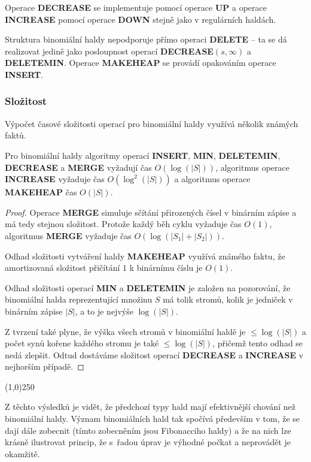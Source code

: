 \documentclass[a4paper,12pt]{article}
\newenvironment{myproof}{
  \begin{proof}
    
  }{
  \end{proof}
  \begin{center}
   \line(1,0){250}
   \end{center}
  }
\begin{document}
Operace {\bf DECREASE} se implementuje pomocí 
ope\-race {\bf UP} a ope\-race {\bf INCREASE} pomocí 
operace {\bf DOWN} stejně jako v regulárních haldách. 


Struktura binomiální haldy nepodporuje přímo operaci 
{\bf DELETE} -- ta se dá realizovat jedině jako posloupnost 
operací {\bf DECREASE$(s,\infty )$} a {\bf DELETEMIN}.  
Operace {\bf MAKEHEAP} se provádí opakováním operace {\bf INSERT}.

\subsubsection{Složitost}

Výpočet časové složitosti operací pro binomiální haldy 
využívá několik známých faktů.

\begin{veta}
    Pro binomiální haldy algoritmy operací 
{\bf IN\-SERT}, {\bf MIN}, {\bf DELETEMIN}, {\bf DECREASE} a {\bf MERGE  }
vy\-ža\-dují čas $O(\log(|S|))$, algoritmus operace {\bf INCRE\-ASE }
vy\-ža\-duje čas $O(\log^2(|S|))$ a algoritmus operace {\bf MAKEHEAP }čas $O(|S|)$.
\end{veta}
\begin{myproof}
  Ope\-race {\bf MERGE }
simuluje sčítání přirozených čísel v binárním zápise a má 
tedy stejnou složitost. Protože každý běh 
cyklu vyžaduje čas $O(1)$, algoritmus {\bf MER\-GE} vyžaduje čas 
$O(\log(|S_1|+|S_2|))$.

Odhad složitosti vytváření haldy {\bf MAKEHEAP } využívá 
známého faktu, že amortizovaná složitost přičítání $1$  
k binárnímu číslu je $O(1)$.  


Odhad složitosti operací {\bf MIN} a {\bf DELETEMIN} je založen na 
pozorování, že binomiální halda reprezentující množinu $
S$ má 
tolik stromů, kolik je jedniček v binárním zápise $
|S|$, a 
to je nejvýše $\log(|S|)$.  

Z tvrzení také plyne, že výška všech stromů v 
binomiální haldě je $\le\log(|S|)$ a počet synů 
kořene každého stromu je 
také $\le\log(|S|)$, přičemž tento odhad se nedá zlepšit. Odtud 
dostáváme složitost operací {\bf DECREASE} a {\bf INCREASE} v nejhorším 
případě. 

\end{myproof}

Z těchto výsledků je vidět, že předchozí 
typy hald mají efektivnější chování než binomiální haldy. 
Význam binomiálních hald tak spo\-čí\-vá především v 
tom, že se dají dále zobecnit (tímto zobecněním jsou Fibonacciho 
haldy) a že na nich lze krásně 
ilustrovat princip, že s~řadou úprav je výhodné počkat 
a neprovádět je okamžitě.
\end{document}
